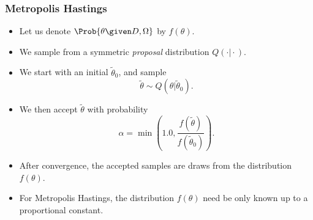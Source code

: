 \documentclass{slides}
\begin{document}
\begin{frame}
	\frametitle{Metropolis Hastings}
	\begin{itemize}	
		\item Let us denote $\Prob{\theta\given D, \Omega}$ by $f(\theta)$.
		\item We sample from a symmetric \emph{proposal} distribution $Q(\cdot\vert\cdot)$.
		\item We start with an initial $\tilde{\theta}_0$, and sample 
			\[\tilde{\theta} \sim Q(\theta\vert\tilde{\theta}_0).\]
		\item We then accept $\tilde{\theta}$ with probability 
			\[\alpha = \min\left(1.0, \frac{f(\tilde{\theta})}{f(\tilde{\theta}_0)}\right).\]
		\item After convergence, the accepted samples are draws from the distribution $f(\theta)$.
		\item For Metropolis Hastings, the distribution $f(\theta)$ need be only known up to a proportional constant.
	\end{itemize}
\end{frame}
\end{document}
